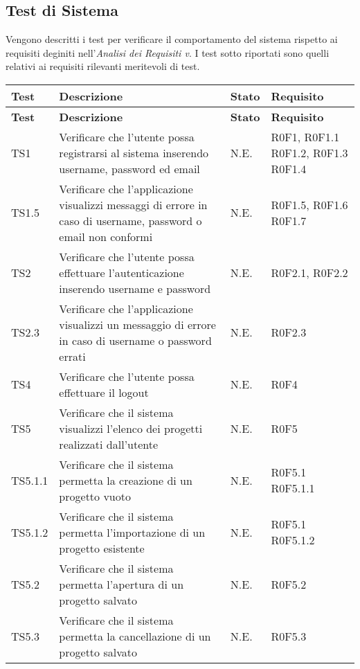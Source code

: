 \subsection{Test di Sistema}
Vengono descritti i test per verificare il comportamento del sistema rispetto ai requisiti deginiti nell'\emph{Analisi dei Requisiti v}\VersioneAR.
I test sotto riportati sono quelli relativi ai requisiti rilevanti meritevoli di test.
\begin{longtable}{p{2.5cm}!{\VRule[1pt]}p{6.5cm}!{\VRule[1pt]}p{1cm}!{\VRule[1pt]}p{3cm}}
\color{white} \textbf{Test} & \color{white} \textbf{Descrizione}  & \color{white} \textbf{Stato}  & \color{white} \textbf{Requisito}\\ 
\endfirsthead 
{} 
\color{white} \textbf{Test} & \color{white} \textbf{Descrizione}  & \color{white} \textbf{Stato}  & \color{white} \textbf{Requisito}\\  
\endhead 
TS1 & Verificare che l'utente possa registrarsi al sistema inserendo username, password ed email  & N.E. & R0F1, R0F1.1\newline
R0F1.2, R0F1.3\newline
R0F1.4\\
TS1.5 & Verificare che l'applicazione visualizzi messaggi di errore in caso di username, password o email non conformi & N.E. & R0F1.5, R0F1.6 \newline
R0F1.7\\
TS2 & Verificare che l'utente possa effettuare l'autenticazione inserendo username e password & N.E. & R0F2.1, R0F2.2\\
TS2.3 & Verificare che l'applicazione visualizzi un messaggio di errore in caso di username o password errati & N.E. & R0F2.3\\
TS4 & Verificare che l'utente possa effettuare il logout & N.E. & R0F4\\
TS5 & Verificare che il sistema visualizzi l'elenco dei progetti realizzati dall'utente & N.E. & R0F5 \\
TS5.1.1 & Verificare che il sistema permetta la creazione di un progetto vuoto & N.E. & R0F5.1 R0F5.1.1\\
TS5.1.2 & Verificare che il sistema permetta l'importazione di un progetto esistente & N.E. & R0F5.1 R0F5.1.2\\
TS5.2 & Verificare che il sistema permetta l'apertura di un progetto salvato & N.E. & R0F5.2\\
TS5.3 & Verificare che il sistema permetta la cancellazione di un progetto salvato & N.E. & R0F5.3\\

\end{longtable}

